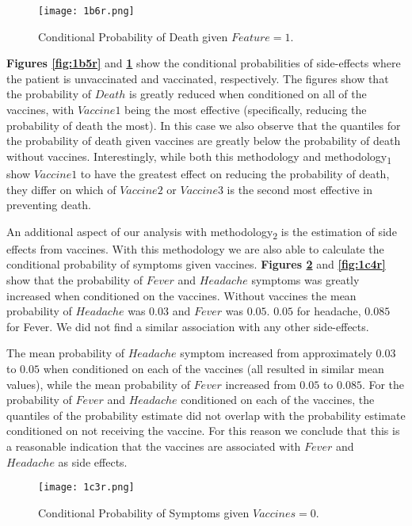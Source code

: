 \begin{figure}[H]
  \texttt{[image: 1b6r.png]}
  \caption{Conditional  Probability  of  Death  given $Feature = 1$.}
    \label{fig:1b6r}
\end{figure}

\textbf{Figures \ref{fig:1b5r}} and \textbf{\ref{fig:1b6r}} show the conditional probabilities of side-effects where the patient is unvaccinated and vaccinated, respectively. The figures show that the probability of $Death$ is greatly reduced when conditioned on all of the vaccines, with $Vaccine1$ being the most effective (specifically, reducing the probability of death the most). In this case we also observe that the quantiles for the probability of death given vaccines are greatly below the probability of death without vaccines. Interestingly, while both this methodology and methodology\textsubscript{1} show $Vaccine1$ to have the greatest effect on reducing the probability of death, they differ on which of $Vaccine2$ or $Vaccine3$ is the second most effective in preventing death.

An additional aspect of our analysis with methodology\textsubscript{2} is the estimation of side effects from vaccines. With this methodology we are also able to calculate the conditional probability of symptoms given vaccines. \textbf{Figures \ref{fig:1c3r}} and \textbf{\ref{fig:1c4r}} show that the probability of $Fever$ and $Headache$ symptoms was greatly increased when conditioned on the vaccines. Without vaccines the mean probability of $Headache$ was $0.03$ and $Fever$ was $0.05$. $0.05$ for headache, $0.085$ for Fever. We did not find a similar association with any other side-effects.

The mean probability of $Headache$ symptom increased from approximately $0.03$ to $0.05$ when conditioned on each of the vaccines (all resulted in similar mean values), while the mean probability of $Fever$ increased from $0.05$ to $0.085$. For the probability of $Fever$ and $Headache$ conditioned on each of the vaccines, the quantiles of the probability estimate did not overlap with the probability estimate conditioned on not receiving the vaccine. For this reason we conclude that this is a reasonable indication that the vaccines are associated with $Fever$ and $Headache$ as side effects.

\graphicspath{{pictures/task1c/}}
\begin{figure}[H]
  \texttt{[image: 1c3r.png]}
  \caption{Conditional  Probability  of  Symptoms  given $Vaccines = 0$.}
    \label{fig:1c3r}
\end{figure}

